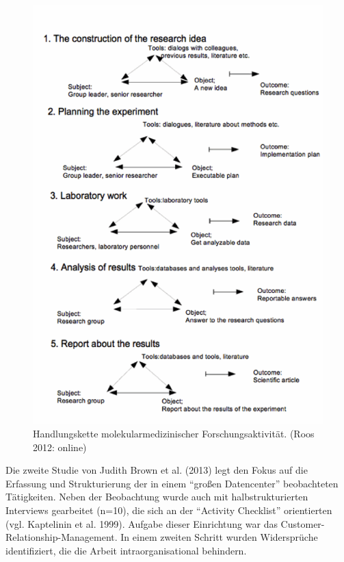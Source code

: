 \documentclass[a4paper,
fontsize=11pt,
oneside,
numbers=noperiodatend,
parskip=half-,
bibliography=totoc,
final
]{scrartcl}
\begin{document}
\begin{figure}[htbp]
\centering
\includegraphics{img/abbildung2.png}
\caption{Handlungskette molekularmedizinischer Forschungsaktivität.
(Roos 2012: online)}
\end{figure}

Die zweite Studie von Judith Brown et al. (2013) legt den Fokus auf die
Erfassung und Strukturierung der in einem \enquote{großen Datencenter}
beobachteten Tätigkeiten. Neben der Beobachtung wurde auch mit
halbstrukturierten Interviews gearbeitet (n=10), die sich an der
\enquote{Activity Checklist} orientierten (vgl. Kaptelinin et al. 1999).
Aufgabe dieser Einrichtung war das Customer-Relationship-Management. In
einem zweiten Schritt wurden Widersprüche identifiziert, die die Arbeit
intraorganisational behindern.
\end{document}
